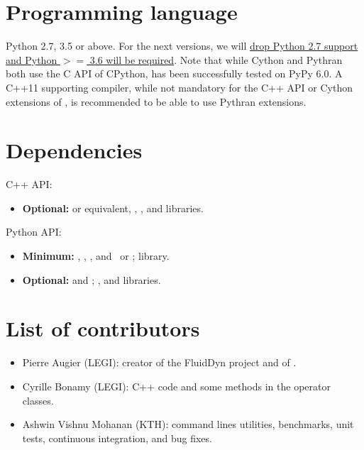 \documentclass{../jors}
\begin{document}
\section*{Programming language}


Python 2.7, 3.5 or above. For the next versions, we will
\href{https://python3statement.org/}{drop Python 2.7 support and Python $>=$
3.6 will be required}.
%
Note that while Cython and Pythran both use the C API of CPython, 
has been successfully tested on PyPy 6.0.
%
A C++11 supporting compiler, while not mandatory for the C++ API or Cython
extensions of , is recommended to be able to use Pythran extensions.

\section*{Dependencies}

C++ API:
\begin{itemize}
  \item{\bf Optional:}  or equivalent, ,
    ,  and  libraries.
\end{itemize}

Python API:

\begin{itemize}
\item {\bf Minimum:} , , , and
  \ or ;  library.
\item {\bf Optional:}  and ; ,
   and  libraries.
\end{itemize}


\section*{List of contributors}


\begin{itemize}
\item Pierre Augier (LEGI): creator of the FluidDyn project and of
.
\item Cyrille Bonamy (LEGI): C++ code and some methods in the operator classes.
\item Ashwin Vishnu Mohanan (KTH): command lines utilities, benchmarks, unit
  tests, continuous integration, and bug fixes.
\end{itemize}
\end{document}
